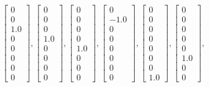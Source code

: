 \documentclass{amsart}
\theoremstyle{plain}
\theoremstyle{definition}
\theoremstyle{plain}
\begin{document}
\begin{equation*}
	\left[\begin{matrix}0\\0\\1.0\\0\\0\\0\\0\\0\end{matrix}\right],
	\left[\begin{matrix}0\\0\\0\\1.0\\0\\0\\0\\0\end{matrix}\right],
	\left[\begin{matrix}0\\0\\0\\0\\1.0\\0\\0\\0\end{matrix}\right],
	\left[\begin{matrix}0\\-1.0\\0\\0\\0\\0\\0\\0\end{matrix}\right],
	\left[\begin{matrix}0\\0\\0\\0\\0\\0\\0\\1.0\end{matrix}\right],
	\left[\begin{matrix}0\\0\\0\\0\\0\\1.0\\0\\0\end{matrix}\right],

\end{equation*}
\end{document}
